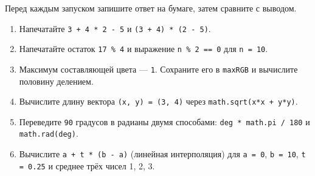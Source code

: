 \begin{taskbox}
Перед каждым запуском запишите ответ на бумаге, затем сравните с выводом.
\begin{enumerate}
  \item Напечатайте \verb|3 + 4 * 2 - 5| и \verb|(3 + 4) * (2 - 5)|.
  \item Напечатайте остаток \verb|17 % 4| и выражение \verb|n % 2 == 0| для \verb|n = 10|.
  \item Максимум составляющей цвета --- \verb|1|. Сохраните его в \verb|maxRGB| и вычислите половину делением.
  \item Вычислите длину вектора \verb|(x, y) = (3, 4)| через \verb|math.sqrt(x*x + y*y)|.
  \item Переведите \verb|90| градусов в радианы двумя способами: \verb|deg * math.pi / 180| и \verb|math.rad(deg)|.
  \item Вычислите \verb|a + t * (b - a)| (линейная интерполяция) для \verb|a = 0|, \verb|b = 10|, \verb|t = 0.25| и среднее трёх чисел 1, 2, 3.
\end{enumerate}
\end{taskbox}
